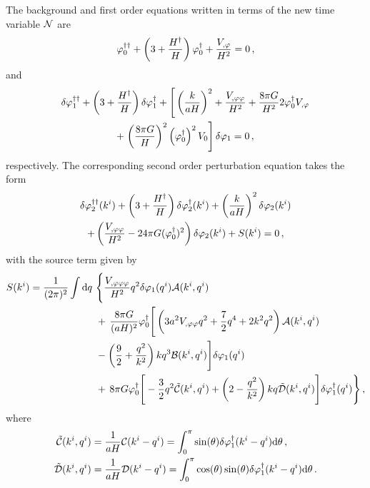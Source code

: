 % 
The background and first order equations written in terms of the new time
variable $\mathcal{N}$ are
%
\begin{equation}
\varphi_{0}^{\dagger\dagger} + \left(3 + \frac{H^{\dagger}}{H}\right)\varphi_{0}^{\dagger} + \frac{V_{,\varphi}}{H^2} = 0
\,,
\label{eq:bgntime}
\end{equation}
% 
and
% 
\begin{multline}
\ddN{\dvp1} + \left(3 + \frac{\dN{H}}{H}\right)\dN{\dvp1} 
 + \Bigg[ \left(\frac{k}{aH}\right)^2 + \frac{\Upp}{H^2} + \frac{8\pi G}{H^2}
 2\dN{\vp_{0}}\Uphi \\
% 
+ \left.\left(\frac{8\pi G}{H}\right)^2
\left(\dN{\vp_{0}}\right)^2\U \right]\dvp1 = 0\,, \label{eq:fontime}
\end{multline}
% 
respectively.
The corresponding second order perturbation equation takes the form
% 
\begin{multline}
 \label{eq:KG2-fourier-sr-ntime}
\ddN{\dvp2}(\kvi) + \left(3 + \frac{\dN{H}}{H}\right)
\dN{\dvp2}(\kvi)+ \left(\frac{k}{aH}\right)^2\dvp2(\kvi) \\
% 
+ \left(\frac{\Upp}{H^2}-{24 \pi G}(\dN{\vp_{0}})^2\right)
\dvp2(\kvi) +S(\kvi) = 0 \,,
\end{multline}
% 
with the source term given by
\begin{align}
\label{eq:KG2-source-ntime}
S(\kvi) = \frac{1}{(2\pi)^2}\int \d q\ &\Bigg\{
\frac{\Uppp}{H^2} q^2 \dvp1(\qvi) \A(\kvi,\qvi) \nonumber\\
&+\, \frac{8\pi G}{(aH)^2}\dN{\vp_{0}} \Bigg[ 
\left( 3a^2\Upp q^2 + \frac{7}{2}q^4 + 2k^2q^2\right) \A(\kvi,\qvi) \nonumber\\
% 
&-\left(\frac{9}{2} + \frac{q^2}{k^2}\right)kq^3 \B(\kvi,\qvi)
\Bigg]\dvp1(\qvi) \nonumber\\
%
&+\, 8\pi G \dN{\vp_{0}} \Bigg[
-\frac{3}{2}q^2 \tilde{\C}(\kvi,\qvi) + \left(2-\frac{q^2}{k^2}\right)kq
\tilde{\D}(\kvi,\qvi) 
\Bigg]\dN{\dvp1}(\qvi) \Bigg\}\,,
%
\end{align}
%
where 
%
\begin{align}
 \tilde{\mathcal{C}}(k^i,q^i) &= \frac{1}{aH} \mathcal{C}(k^i-q^i) = \int_0^\pi \sin(\theta)
\delta\varphi_{1}^{\dagger}(k^i-q^i) \mathrm{d}\theta \,,\nonumber \\
 \tilde{\mathcal{D}}(k^i,q^i) &= \frac{1}{aH} \mathcal{D}(k^i-q^i) = \int_0^\pi \cos(\theta)
\sin(\theta) \delta\varphi_{1}^{\dagger}(k^i-q^i)
\mathrm{d}\theta \,.
\end{align}




